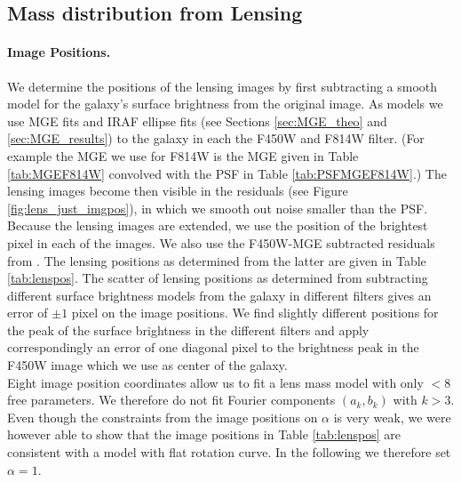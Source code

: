 \subsection{Mass distribution from Lensing} \label{sec:results_lensing}

\paragraph{Image Positions.} We determine the positions of the lensing images by first subtracting a smooth model for the galaxy's surface brightness from the original image. As models we use MGE fits and IRAF ellipse fits  (see Sections \ref{sec:MGE_theo} and \ref{sec:MGE_results})  to the galaxy in each the F450W and F814W filter. (For example the MGE we use for F814W is the MGE given in Table \ref{tab:MGEF814W} convolved with the PSF in Table \ref{tab:PSFMGEF814W}.) The lensing images become then visible in the residuals (see Figure \ref{fig:lens_just_imgpos}), in which we smooth out noise smaller than the PSF. Because the lensing images are extended, we use the position of the brightest pixel in each of the images. We also use the F450W-MGE subtracted residuals from \citet{SWELLSIII}. The lensing positions as determined from the latter are given in Table \ref{tab:lenspos}. The scatter of lensing positions as determined from subtracting different surface brightness models from the galaxy in different filters gives an error of $\pm 1$ pixel on the image positions. We find slightly different positions for the peak of the surface brightness in the different filters and apply correspondingly an error of one diagonal pixel to the brightness peak in the F450W image which we use as center of the galaxy.
\\Eight image position coordinates allow us to fit a lens mass model with only $<8$ free parameters. We therefore do not fit Fourier components $(a_k,b_k)$ with $k > 3$.
\\Even though the constraints from the image positions on $\alpha$ is very weak, we were however able to show that the image positions in Table \ref{tab:lenspos} are consistent with a model with flat rotation curve. In the following we therefore set $\alpha=1$.

